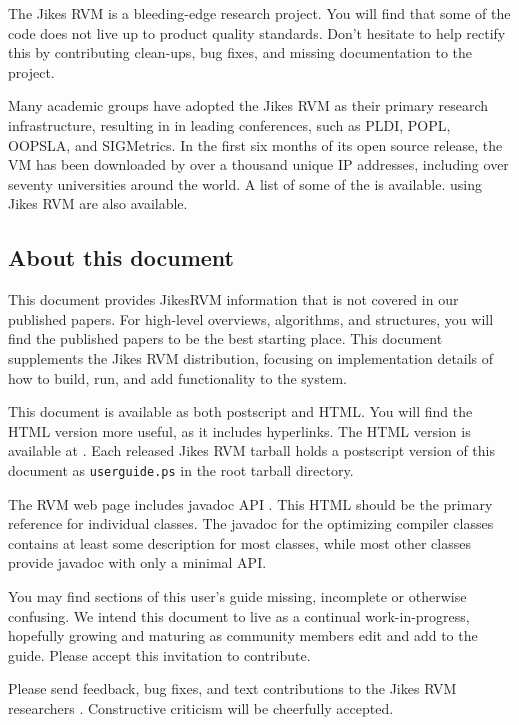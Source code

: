 The Jikes RVM is a bleeding-edge research project.  You will find that
some of the code  does not live up to product  
quality standards. Don't hesitate to help rectify this by
contributing clean-ups, bug fixes, and missing documentation to 
the project.  

Many academic groups have adopted the Jikes RVM as their primary
research infrastructure, resulting in 
in leading
conferences, such as PLDI, POPL, OOPSLA, and SIGMetrics.  In the first six
months of its open source release, the VM has been downloaded by over
a thousand unique IP addresses, including over seventy
universities around the world. A list
of some of the  is available.
 using
Jikes RVM are also available.

\JikesTMFooter

\JavaTMFooter

\subsection {About this document}

This document provides Jikes\trademark RVM information that is not covered in
our published papers.  For high-level overviews, algorithms, and
structures, you will find the published papers to be the best starting
place. This document supplements
the Jikes RVM distribution, focusing on implementation
details of how to build, run, and add functionality to the system.

This document is available as both postscript and HTML.  You will find the
HTML version more useful, as it includes hyperlinks. The HTML version is
available at 
\xlink{{\tt \RVMUserGuideURL}}{\RVMUserGuideURL}.  Each released Jikes RVM
tarball holds a postscript version of this document as {\tt userguide.ps}
in the root tarball directory.

The RVM web page includes 
javadoc API 
. 
This HTML should be the
primary reference for individual classes.  The javadoc for the optimizing
compiler classes contains at least some description for most classes,
while most other classes provide javadoc with only a minimal API.

You may find sections of this user's guide missing, incomplete or
otherwise confusing. We intend this document to live as a continual
work-in-progress, hopefully growing and maturing as community members
edit and add to the guide.  Please accept this invitation to
contribute.

Please send feedback, bug fixes, and text contributions to the Jikes RVM
researchers 
.  
Constructive criticism will be cheerfully 
accepted. 

\JikesTMFooter
